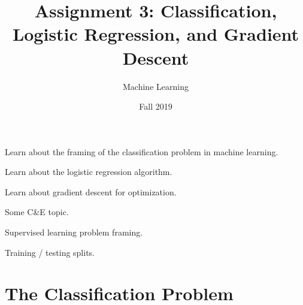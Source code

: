 \documentclass[assignment03_Solutions]{subfiles}
\title{Assignment 3: Classification, Logistic Regression, and Gradient Descent}
\author{Machine Learning}
\date{Fall 2019}
\begin{document}
\maketitle
\thispagestyle{firstpage}


\begin{learningobjectives}
\bi
\item Learn about the framing of the classification problem in machine learning.
\item Learn about the logistic regression algorithm.
\item Learn about gradient descent for optimization.
\item Some C\&E topic.
\ei
\end{learningobjectives}

\begin{priorknowledge}
\bi
\item Supervised learning problem framing.
\item Training / testing splits.
\ei
\end{priorknowledge}
\vspace{1em}

%
%


\section{The Classification Problem}
\end{document}
